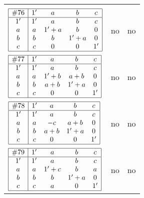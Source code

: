 \documentclass[12pt]{article}
\theoremstyle{definition}
\newcommand{\join}{\mathbin{+}}%
\newcommand{\id}{{1'}}%
\begin{document}
\begin{center}
\begin{longtable}{l|c|c}
{\begin{tikzpicture}[<->,shorten <=1pt,shorten >=1pt,label distance=0mm, font=\small]
\end{tikzpicture}
}     \\[15mm]

$
\begin{array}{|c|cccc|} \hline
\#76 & \id & a & b & c \\ \hline
\id & \id & a & b & c \\
a & a & \id \join a & b & 0 \\
b & b & b & \id \join a & 0 \\
c & c & 0 & 0 & \id \\ \hline
\end{array}
$
 & no  
 & no      \\[15mm]

$
\begin{array}{|c|cccc|} \hline
\#77 & \id & a & b & c \\ \hline
\id & \id & a & b & c \\
a & a & \id \join b & a \join b & 0 \\
b & b & a \join b & \id \join a & 0 \\
c & c & 0 & 0 & \id \\ \hline
\end{array}
$
 & no  
 & no      \\[15mm]

$
\begin{array}{|c|cccc|} \hline
\#78 & \id & a & b & c \\ \hline
\id & \id & a & b & c \\
a & a & -c & a \join b & 0 \\
b & b & a \join b & \id \join a & 0 \\
c & c & 0 & 0 & \id \\ \hline
\end{array}
$
 & no  
 & no      \\[15mm]

$
\begin{array}{|c|cccc|} \hline
\#79 & \id & a & b & c \\ \hline
\id & \id & a & b & c \\
a & a & \id \join c & b & a \\
b & b & b & \id \join a & 0 \\
c & c & a & 0 & \id \\ \hline
\end{array}
$
 & no  
 & no      \\[15mm]


\end{longtable}
\end{center}
\end{document}
